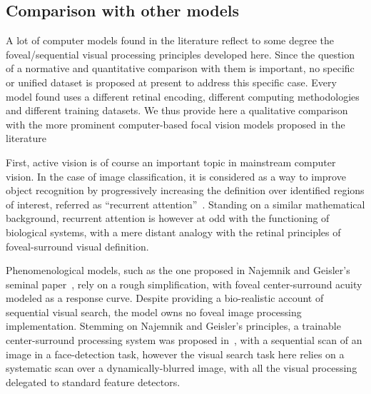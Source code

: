 \subsection{Comparison with other models}

A lot of computer models found in the literature reflect to some degree the foveal/sequential visual processing principles developed here.
Since the question of a normative and quantitative comparison with them is important, no specific or unified dataset is proposed at present
to address this specific case. Every model found uses a different retinal encoding, different computing methodologies and different training datasets.
We thus provide here a qualitative comparison with the more prominent computer-based focal vision models proposed in the literature




First, active vision is of course an important topic in mainstream computer vision. In the case of image classification, it is considered as a way to improve object recognition by progressively increasing the definition over identified regions of interest, referred as ``recurrent attention''~\cite{mnih2014recurrent,fu2017look}.
Standing on a similar mathematical background, recurrent attention is however at odd with the functioning of biological systems, with a mere distant analogy with the retinal principles of foveal-surround visual definition.

Phenomenological models, such as the one proposed in Najemnik and Geisler's seminal paper~\cite{Najemnik05}, rely on a rough simplification, with foveal center-surround acuity modeled as a response curve. Despite providing a bio-realistic account of sequential visual search, the model owns no foveal image processing implementation. Stemming on Najemnik and Geisler's principles, a trainable center-surround processing system was proposed in~\cite{Butko2010infomax}, with a sequential scan of an image in a face-detection task, however the visual search task here relies on a systematic scan over a dynamically-blurred image, with all the visual processing delegated to standard feature detectors.

